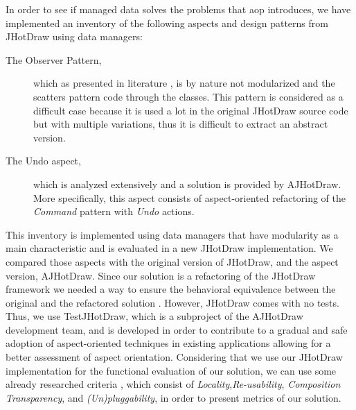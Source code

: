 In order to see if managed data solves the problems that \ac{aop} introduces, we have implemented an inventory of the following aspects and design patterns from JHotDraw using data managers:
\begin{description}

  \item[The Observer Pattern,] which as presented in literature \cite{tourwe2003existence} \cite{hannemann2005role} \cite{marin2005approach}, is by nature not modularized and the scatters pattern code through the classes. 
  This pattern is considered as a difficult case because it is used a lot in the original JHotDraw source code but with multiple variations, thus it is difficult to extract an abstract version.

  \item[The Undo aspect,] which is analyzed extensively \cite{marin2004refactoring} and a solution is provided by AJHotDraw. 
  More specifically, this aspect consists of aspect-oriented refactoring of the \textit{Command} pattern with \textit{Undo} actions.




\end{description}
This inventory is implemented using data managers that have modularity as a main characteristic and is evaluated in a new JHotDraw implementation.
We compared those aspects with the original version of JHotDraw, and the aspect version, AJHotDraw. 
Since our solution is a refactoring of the JHotDraw framework we needed a way to ensure the behavioral equivalence between the original and the refactored solution \cite{fowler2009refactoring}. However, JHotDraw comes with no tests. 
Thus, we use TestJHotDraw, which is a subproject of the AJHotDraw development team, and is developed in order to contribute to a gradual and safe adoption of aspect-oriented techniques in existing applications allowing for a better assessment of aspect orientation.
Considering that we use our JHotDraw implementation for the functional evaluation of our solution, we can use some already researched criteria \cite{hannemann2002design}, which consist of \textit{Locality},\textit{Re-usability}, \textit{Composition Transparency}, and \textit{(Un)pluggability}, in order to present metrics of our solution. 

